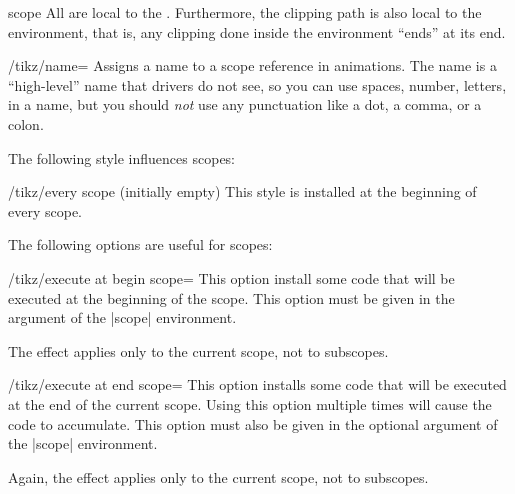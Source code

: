 \begin{environment}{{scope}}
  All  are local to the . Furthermore, the clipping path is also local to the
  environment, that is, any clipping done inside the environment
  ``ends'' at its end.

\begin{codeexample}[]
\end{codeexample}

  \begin{key}{/tikz/name=}
    Assigns a name to a scope reference in animations. The name
    is a ``high-level'' name that drivers do not see, so you can use
    spaces, number, letters, in a name, but you should \emph{not}
    use any punctuation like a dot, a comma, or a colon.
  \end{key}

  The following style influences scopes:
  \begin{stylekey}{/tikz/every scope (initially \normalfont empty)}
    This style is installed at the beginning of every scope.
  \end{stylekey}

  The following options are useful for scopes:
  \begin{key}{/tikz/execute at begin scope=}
    This option install some code that will be executed
    at the beginning of the scope. This option must be
    given in the argument of the |{scope}| environment.

    The effect applies only to the current scope, not to subscopes.
  \end{key}
  \begin{key}{/tikz/execute at end scope=}
    This option installs some code that will be executed
    at the end of the  current scope. Using this option multiple times
    will  cause the code to accumulate. This option must also be given
    in the optional argument of the |{scope}| environment.

    Again, the effect applies only to the current scope, not to subscopes.
  \end{key}
\end{environment}

